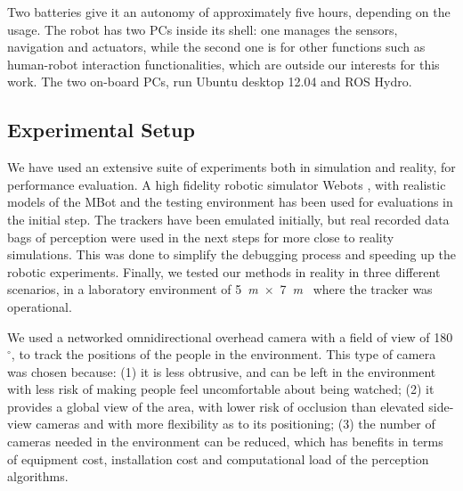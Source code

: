 Two batteries give it an autonomy of approximately five hours, depending on the usage.
The robot has two PCs inside its shell: one manages the sensors, navigation and actuators, while the second one is for other functions such as human-robot interaction functionalities, which are outside our interests for this work. The two on-board PCs, run Ubuntu desktop 12.04 and ROS Hydro. 


\subsection{Experimental Setup}
\label{sec:Experimental_setup}


We have used an extensive suite of experiments both in simulation and reality, for performance evaluation. A high fidelity robotic simulator Webots \cite{michel1998webots}, with realistic models of the MBot and the testing environment has been used for evaluations in the initial step. The trackers have been emulated initially, but real recorded data bags of perception were used in the next steps for more close to reality simulations. This was done to simplify the debugging process and speeding up the robotic experiments. %
Finally, we tested our methods in reality in three different scenarios, in a laboratory environment of 5~\textit{m}~$\times$~7~\textit{m}%
~where the tracker was operational.
 

We used a networked omnidirectional overhead camera with a field of view of 180$^{\circ}$, to track the positions of the people in the environment. This type of camera was chosen because: (1) it is less obtrusive, and can be left in the environment with less risk of making people feel uncomfortable about being watched; 
(2) it provides a global view of the area, with lower risk of occlusion than elevated side-view cameras and with more flexibility as to its positioning; (3) the number of cameras needed in the environment can be reduced, which has benefits in terms of equipment cost, installation cost and computational load of the perception algorithms. 


